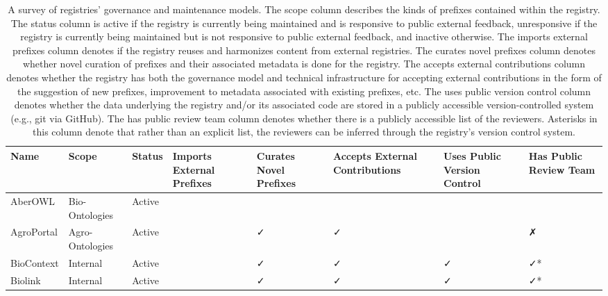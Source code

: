 \begin{table}
\centering
\caption{A survey of registries' governance and maintenance models. The scope column describes the kinds of prefixes contained within the registry. The status column is active if the registry is currently being maintained and is responsive to public external feedback, unresponsive if the registry is currently being maintained but is not responsive to public external feedback, and inactive otherwise. The imports external prefixes column denotes if the registry reuses and harmonizes content from external registries. The curates novel prefixes column denotes whether novel curation of prefixes and their associated metadata is done for the registry. The accepts external contributions column denotes whether the registry has both the governance model and technical infrastructure for accepting external contributions in the form of the suggestion of new prefixes, improvement to metadata associated with existing prefixes, etc. The uses public version control column denotes whether the data underlying the registry and/or its associated code are stored in a publicly accessible version-controlled system (e.g., git via GitHub). The has public review team column denotes whether there is a publicly accessible list of the reviewers. Asterisks in this column denote that rather than an explicit list, the reviewers can be inferred through the registry's version control system.}
\label{tab:registry-comparison-governance}
\begin{tabular}{llllllll}
\toprule
           Name &           Scope &       Status & Imports External Prefixes & Curates Novel Prefixes & Accepts External Contributions & Uses Public Version Control & Has Public Review Team \\
\midrule
        AberOWL &  Bio-Ontologies &       Active &                           &                        &                                &                             &                        \\
     AgroPortal & Agro-Ontologies &       Active &                           &                      ✓ &                              ✓ &                             &                      ✗ \\
     BioContext &        Internal &       Active &                           &                      ✓ &                              ✓ &                           ✓ &                     ✓* \\
        Biolink &        Internal &       Active &                           &                      ✓ &                              ✓ &                           ✓ &                     ✓* \\

\end{tabular}
\end{table}
